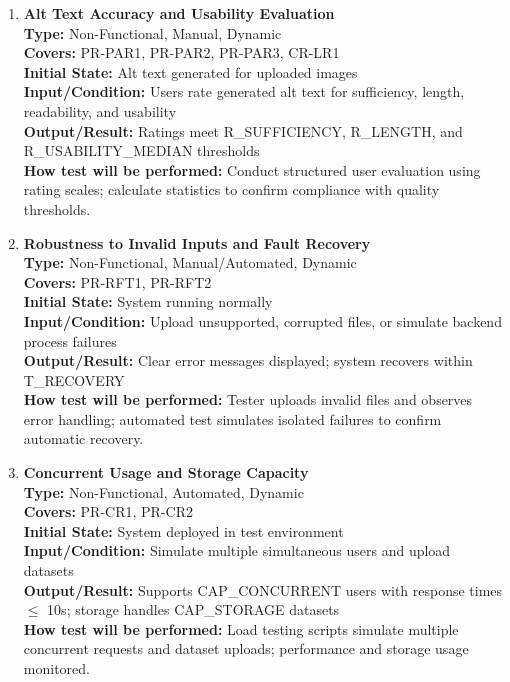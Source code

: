 \documentclass[12pt, titlepage]{article}
\begin{document}
\begin{enumerate}[label=NFR-ST \arabic*., wide=0pt, leftmargin=*]
  \item \textbf{Alt Text Accuracy and Usability Evaluation} \\[2mm]
    \textbf{Type:} Non-Functional, Manual, Dynamic \\
    \textbf{Covers:} PR-PAR1, PR-PAR2, PR-PAR3, CR-LR1 \\
    \textbf{Initial State:} Alt text generated for uploaded images \\
    \textbf{Input/Condition:} Users rate generated alt text for
    sufficiency, length, readability, and usability \\
    \textbf{Output/Result:} Ratings meet R\_SUFFICIENCY, R\_LENGTH, and
    R\_USABILITY\_MEDIAN thresholds \\[2mm]
    \textbf{How test will be performed:} Conduct structured user
    evaluation using rating scales; calculate statistics to confirm
    compliance with quality thresholds.

  \item \textbf{Robustness to Invalid Inputs and Fault Recovery} \\[2mm]
    \textbf{Type:} Non-Functional, Manual/Automated, Dynamic \\
    \textbf{Covers:} PR-RFT1, PR-RFT2 \\
    \textbf{Initial State:} System running normally \\
    \textbf{Input/Condition:} Upload unsupported, corrupted files, or
    simulate backend process failures \\
    \textbf{Output/Result:} Clear error messages displayed; system recovers within T\_RECOVERY \\[2mm]
    \textbf{How test will be performed:} Tester uploads invalid files
    and observes error handling; automated test simulates isolated
    failures to confirm automatic recovery.

  \item \textbf{Concurrent Usage and Storage Capacity} \\[2mm]
    \textbf{Type:} Non-Functional, Automated, Dynamic \\
    \textbf{Covers:} PR-CR1, PR-CR2 \\
    \textbf{Initial State:} System deployed in test environment \\
    \textbf{Input/Condition:} Simulate multiple simultaneous users
    and upload datasets \\
    \textbf{Output/Result:} Supports CAP\_CONCURRENT users with
    response times $\le$ 10s; storage handles CAP\_STORAGE datasets \\[2mm]
    \textbf{How test will be performed:} Load testing scripts
    simulate multiple concurrent requests and dataset uploads;
    performance and storage usage monitored.


\end{enumerate}
\end{document}

